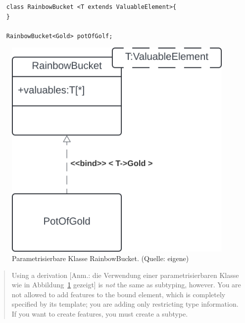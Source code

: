 \begin{verbatim}
    class RainbowBucket <T extends ValuableElement>{
    }

    RainbowBucket<Gold> potOfGolf;

\end{verbatim}
\begin{figure}
    \centering
    \includegraphics[scale=0.4]{part three/Klassendiagramme - Erweiterte Konzepte und Paketdiagramme/img/template}
    \caption{Parametrisierbare Klasse RainbowBucket. (Quelle: eigene)}
    \label{fig:template}
\end{figure}

\blockquote[{\cite[82, Hervorhebungen i.O.]{Fow03b}}]{
Using a derivation [Anm.: die Verwendung einer parametrisierbaren Klasse wie in Abbildung~\ref{fig:template} gezeigt] is \textit{not}
the same as subtyping, however. You are not allowed to add features to the bound element, which is completely specified by its template; you are adding only restricting type information. If you want to create features, you must create a subtype.
}